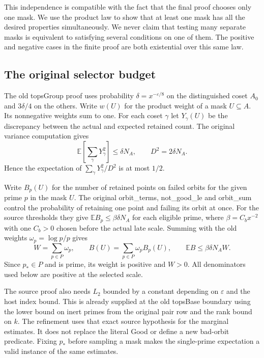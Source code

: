 \documentclass[12pt,letterpaper]{article}
\DeclareRobustCommand{\id}[1]{\mbox{\small\ttfamily #1}}
\begin{document}
This independence is compatible with the fact that the final proof chooses only one mask. We use the product law to show that at least one mask has all the desired properties simultaneously. We never claim that testing many separate masks is equivalent to satisfying several conditions on one of them. The positive and negative cases in the finite proof are both existential over this same law.

\subsection{The original selector budget}

The old \id{topsGroup} proof uses probability \(\delta=x^{-\varepsilon/8}\) on the distinguished coset \(A_0\) and \(3\delta/4\) on the others. Write \(w(U)\) for the product weight of a mask \(U\subseteq A\). Its nonnegative weights sum to one. For each coset \(\gamma\) let \(Y_\gamma(U)\) be the discrepancy between the actual and expected retained count. The original variance computation gives
\[
  \mathbb E\left[\sum_\gamma Y_\gamma^2\right]\le\delta N_A,\qquad
       D^2=2\delta N_A.
\]
Hence the expectation of \(\sum_\gamma Y_\gamma^2/D^2\) is at most \(1/2\).

Write \(B_p(U)\) for the number of retained points on failed orbits for the given prime \(p\) in the mask \(U\). The original \id{orbit\_terms}, \id{not\_good\_le} and \id{orbit\_sum} control the probability of retaining one point and failing its orbit at once. For the source thresholds they give \(\mathbb E B_p\le\beta\delta N_A\) for each eligible prime, where \(\beta=C_b x^{-2}\) with one \(C_b>0\) chosen before the actual late scale. Summing with the old weights \(\omega_p=\log p/p\) gives
\[
 W=\sum_{p\in P}\omega_p,\qquad
 B(U)=\sum_{p\in P}\omega_p B_p(U),\qquad
 \mathbb E B\le\beta\delta N_A W .
\]
Since \(p_\ast\in P\) and is prime, its weight is positive and \(W>0\). All denominators used below are positive at the selected scale.

The source proof also needs \(L_2\) bounded by a constant depending on \(\varepsilon\) and the host index bound. This is already supplied at the old \id{topsBase} boundary using the lower bound on inert primes from the original pair row and the rank bound on \(k\). The refinement uses that exact source hypothesis for the marginal estimates. It does not replace the literal \id{Good} or define a new bad-orbit predicate. Fixing \(p_\ast\) before sampling a mask makes the single-prime expectation a valid instance of the same estimates.
\end{document}
